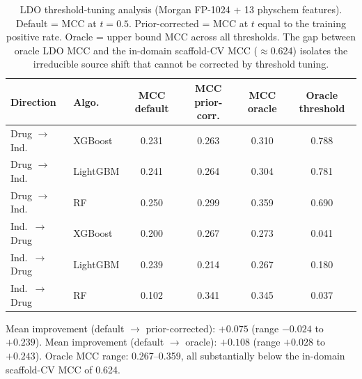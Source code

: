 \begin{table}[ht]
\caption{LDO threshold-tuning analysis (Morgan FP-1024 + 13 physchem features). Default = MCC at $t=0.5$. Prior-corrected = MCC at $t$ equal to the training positive rate. Oracle = upper bound MCC across all thresholds. The gap between oracle LDO MCC and the in-domain scaffold-CV MCC ($\approx$0.624) isolates the irreducible source shift that cannot be corrected by threshold tuning.}
\centering
\small
\begin{tabular}{@{}llcccc@{}}
\toprule
Direction & Algo. & MCC default & MCC prior-corr. & MCC oracle & Oracle threshold \\
\midrule
Drug $\to$ Ind.\ & XGBoost & 0.231 & 0.263 & 0.310 & 0.788 \\
Drug $\to$ Ind.\ & LightGBM & 0.241 & 0.264 & 0.304 & 0.781 \\
Drug $\to$ Ind.\ & RF & 0.250 & 0.299 & 0.359 & 0.690 \\
Ind.\ $\to$ Drug & XGBoost & 0.200 & 0.267 & 0.273 & 0.041 \\
Ind.\ $\to$ Drug & LightGBM & 0.239 & 0.214 & 0.267 & 0.180 \\
Ind.\ $\to$ Drug & RF & 0.102 & 0.341 & 0.345 & 0.037 \\
\bottomrule
\end{tabular}

\medskip
\footnotesize
Mean improvement (default $\to$ prior-corrected): $+0.075$ (range $-0.024$ to $+0.239$).
Mean improvement (default $\to$ oracle): $+0.108$ (range $+0.028$ to $+0.243$).
Oracle MCC range: 0.267--0.359, all substantially below the in-domain scaffold-CV MCC of 0.624.
\end{table}
